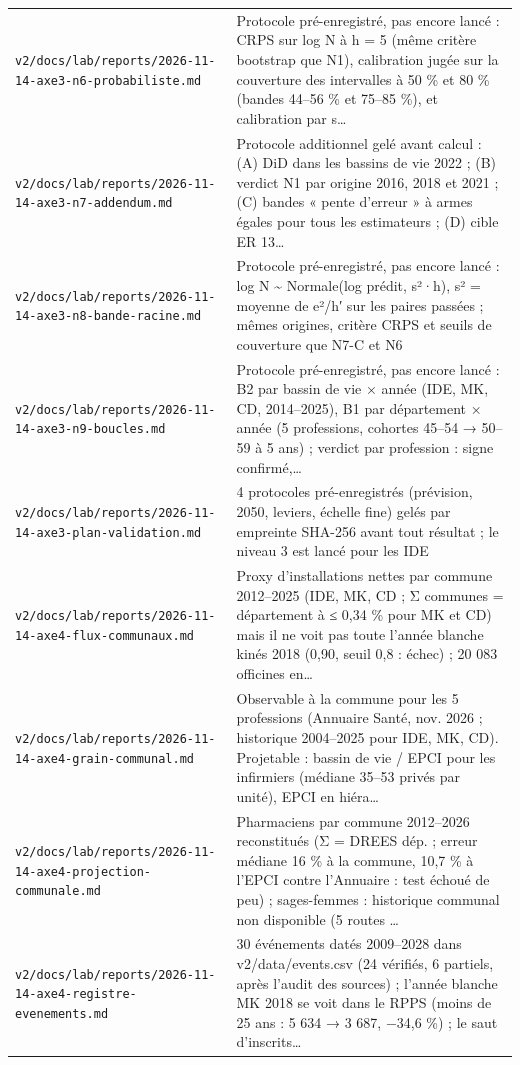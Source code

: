 \begin{small}
\begin{longtable}{@{}p{}p{}@{}}
\texttt{v2/docs/lab/reports/2026-11-14-axe3-n6-probabiliste.md} & Protocole pré-enregistré, pas encore lancé : CRPS sur log N à h = 5 (même critère bootstrap que N1), calibration jugée sur la couverture des intervalles à 50 \% et 80 \% (bandes 44–56 \% et 75–85 \%), et calibration par s… \\
\texttt{v2/docs/lab/reports/2026-11-14-axe3-n7-addendum.md} & Protocole additionnel gelé avant calcul : (A) DiD dans les bassins de vie 2022 ; (B) verdict N1 par origine 2016, 2018 et 2021 ; (C) bandes « pente d'erreur » à armes égales pour tous les estimateurs ; (D) cible ER 13… \\
\texttt{v2/docs/lab/reports/2026-11-14-axe3-n8-bande-racine.md} & Protocole pré-enregistré, pas encore lancé : log N \textasciitilde{} Normale(log prédit, s²·h), s² = moyenne de e²/h′ sur les paires passées ; mêmes origines, critère CRPS et seuils de couverture que N7-C et N6 \\
\texttt{v2/docs/lab/reports/2026-11-14-axe3-n9-boucles.md} & Protocole pré-enregistré, pas encore lancé : B2 par bassin de vie × année (IDE, MK, CD, 2014–2025), B1 par département × année (5 professions, cohortes 45–54 → 50–59 à 5 ans) ; verdict par profession : signe confirmé,… \\
\texttt{v2/docs/lab/reports/2026-11-14-axe3-plan-validation.md} & 4 protocoles pré-enregistrés (prévision, 2050, leviers, échelle fine) gelés par empreinte SHA-256 avant tout résultat ; le niveau 3 est lancé pour les IDE \\
\texttt{v2/docs/lab/reports/2026-11-14-axe4-flux-communaux.md} & Proxy d'installations nettes par commune 2012–2025 (IDE, MK, CD ; Σ communes = département à ≤ 0,34 \% pour MK et CD) mais il ne voit pas toute l'année blanche kinés 2018 (0,90, seuil 0,8 : échec) ; 20 083 officines en… \\
\texttt{v2/docs/lab/reports/2026-11-14-axe4-grain-communal.md} & Observable à la commune pour les 5 professions (Annuaire Santé, nov. 2026 ; historique 2004–2025 pour IDE, MK, CD). Projetable : bassin de vie / EPCI pour les infirmiers (médiane 35–53 privés par unité), EPCI en hiéra… \\
\texttt{v2/docs/lab/reports/2026-11-14-axe4-projection-communale.md} & Pharmaciens par commune 2012–2026 reconstitués (Σ = DREES dép. ; erreur médiane 16 \% à la commune, 10,7 \% à l'EPCI contre l'Annuaire : test échoué de peu) ; sages-femmes : historique communal non disponible (5 routes … \\
\texttt{v2/docs/lab/reports/2026-11-14-axe4-registre-evenements.md} & 30 événements datés 2009–2028 dans v2/data/events.csv (24 vérifiés, 6 partiels, après l'audit des sources) ; l'année blanche MK 2018 se voit dans le RPPS (moins de 25 ans : 5 634 → 3 687, −34,6 \%) ; le saut d'inscrits… \\

\end{longtable}
\end{small}
